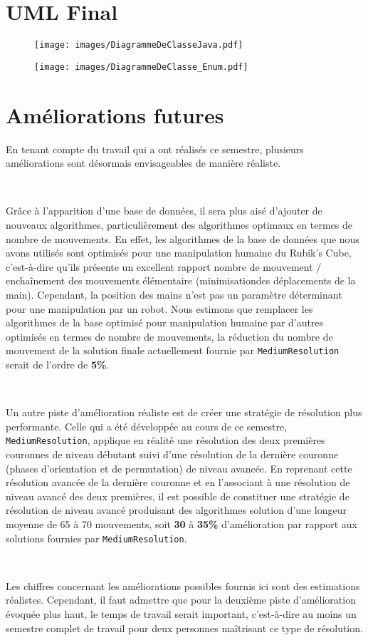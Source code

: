 \section{UML Final}
    
    
\begin{figure}[!h]
\texttt{[image: images/DiagrammeDeClasseJava.pdf]}
\end{figure}

\begin{figure}[!h]
\texttt{[image: images/DiagrammeDeClasse\_Enum.pdf]}
\end{figure}

    
\section{Améliorations futures}
    En tenant compte du travail qui a ont réalisés ce semestre, plusieurs améliorations sont désormais envisageables de manière réaliste.
    
    ~
    
    Grâce à l'apparition d'une base de données, il sera plus aisé d'ajouter de nouveaux algorithmes, particulièrement des algorithmes optimaux en termes de nombre de mouvements. En effet, les algorithmes de la base de données que nous avons utilisés sont optimisés pour une manipulation humaine du Rubik's Cube, c'est-à-dire qu'ils présente un excellent rapport nombre de mouvement / enchaînement des mouvements élémentaire (minimisationdes déplacements de la main). Cependant, la position des mains n'est pas un paramètre déterminant pour une manipulation par un robot. Nous estimons que remplacer les algorithmes de la base optimisé pour manipulation humaine par d'autres optimisés en termes de nombre de mouvements, la réduction du nombre de mouvement de la solution finale actuellement fournie par \texttt{MediumResolution} serait de l'ordre de \textbf{5\%}.
    
    ~
    
    Un autre piste d'amélioration réaliste est de créer une stratégie de résolution plus performante. Celle qui a été développée au cours de ce semestre, \texttt{MediumResolution}, applique en réalité une résolution des deux premières couronnes de niveau débutant suivi d'une résolution de la dernière couronne (phases d'orientation et de permutation) de niveau avancée. En reprenant cette résolution avancée de la dernière couronne et en l'associant à une résolution de niveau avancé des deux premières, il est possible de constituer une stratégie de résolution de niveau avancé produisant des algorithmes solution d'une longeur moyenne de 65 à 70 mouvements, soit \textbf{30} à \textbf{35\%} d'amélioration par rapport aux solutions fournies par \texttt{MediumResolution}.
    
    ~ 
    
    Les chiffres concernant les améliorations possibles fournis ici sont des estimations réalistes. Cependant, il faut admettre que pour la deuxième piste d'amélioration évoquée plus haut, le temps de travail serait important, c'est-à-dire au moins un semestre complet de travail pour deux personnes maîtrisant ce type de résolution.
    
    
